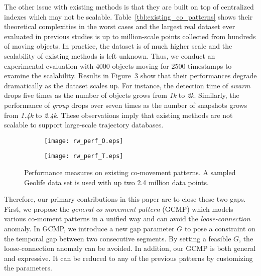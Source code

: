 The other issue with existing methods is that they are built on top of centralized indexes which may not be scalable. Table~\ref{tbl:existing_co_patterns} shows their theoretical complexities in the worst cases and the largest real dataset ever evaluated in previous studies is up to million-scale points collected from hundreds of moving objects. In practice, the dataset is of much higher scale and the scalability of existing methods is left unknown. Thus, we conduct an experimental evaluation with $4000$ objects moving for $2500$ timestamps to examine the scalability. Results in Figure~\ref{fig:related_work_scalability} show that their performances degrade dramatically as the dataset scales up. For instance,
the detection time of \emph{swarm} drops five times as the number of objects grows from \emph{1k} to \emph{2k}. Similarly,
the performance of \emph{group} drops over seven times as the number of snapshots grows from \emph{1.4k} to \emph{2.4k}.
These observations imply that existing methods are not scalable to support large-scale trajectory databases. 

\begin{figure}[h]
    \centering
    \begin{subfigure}[b]{0.23\textwidth}
            \centering
            \texttt{[image: rw\_perf\_O.eps]}
    \label{fig:fig1}
    \end{subfigure}
    \begin{subfigure}[b]{0.23\textwidth}
            \centering
            \texttt{[image: rw\_perf\_T.eps]}
    \label{fig:fig2}
    \end{subfigure}
    \caption{Performance measures on existing co-movement patterns. A sampled Geolife data set
    is used with up two 2.4 million data points.}
    \label{fig:related_work_scalability}
\end{figure}




Therefore, our primary contributions in this paper are to close these two gaps. 
First, we propose the \emph{general co-movement pattern} (GCMP) which models
various co-moment patterns in a unified way and can avoid 
the \emph{loose-connection} anomaly. In GCMP, we introduce a new gap parameter $G$ to pose a constraint on the temporal gap between two consecutive segments. By setting a feasible $G$, the loose-connection anomaly can be avoided. In addition, our GCMP is both general and expressive. It can be reduced to any of the previous patterns by customizing the parameters.

